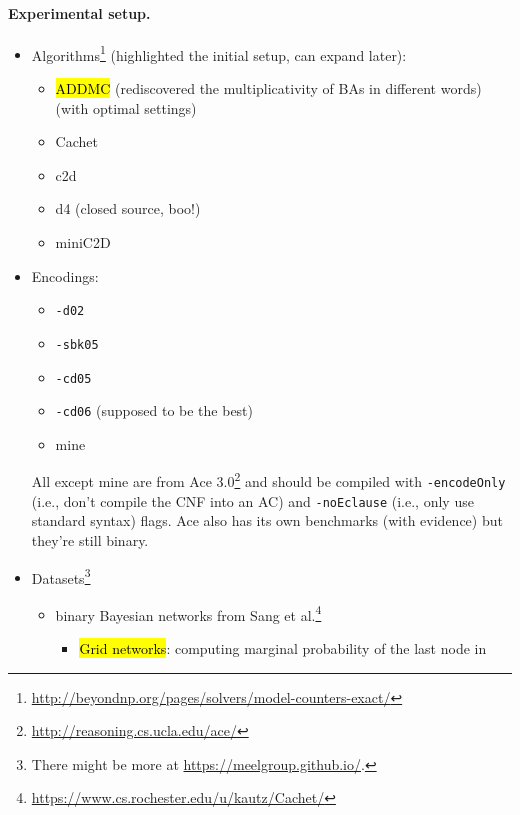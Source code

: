 \documentclass{article}
\theoremstyle{definition}
\theoremstyle{remark}
\begin{document}
\paragraph{Experimental setup.}
\begin{itemize}
\item
  Algorithms\footnote{\url{http://beyondnp.org/pages/solvers/model-counters-exact/}}
  (highlighted the initial setup, can expand later):
  \begin{itemize}
  \item \hl{ADDMC} \cite{DBLP:conf/aaai/DudekPV20} (rediscovered the
    multiplicativity of BAs in different words) (with optimal settings)
  \item Cachet \cite{DBLP:conf/sat/SangBBKP04}
  \item c2d \cite{DBLP:conf/ecai/Darwiche04}
  \item d4 \cite{DBLP:conf/ijcai/LagniezM17} (closed source, boo!)
  \item miniC2D  \cite{DBLP:conf/ijcai/OztokD15}
  \end{itemize}
\item Encodings:
  \begin{itemize}
  \item \texttt{-d02} \cite{DBLP:conf/kr/Darwiche02}
  \item \texttt{-sbk05} \cite{DBLP:conf/aaai/SangBK05}
  \item \texttt{-cd05} \cite{DBLP:conf/ijcai/ChaviraD05}
  \item \texttt{-cd06} \cite{DBLP:conf/sat/ChaviraD06} (supposed to be the best)
  \item mine
  \end{itemize}
  All except mine are from Ace
  3.0\footnote{\url{http://reasoning.cs.ucla.edu/ace/}} and should be compiled
  with \texttt{-encodeOnly} (i.e., don't compile the CNF into an AC) and
  \texttt{-noEclause} (i.e., only use standard syntax) flags. Ace also has its
  own benchmarks (with evidence) but they're still binary.
\item Datasets\footnote{There might be more at
    \url{https://meelgroup.github.io/}.}
  \begin{itemize}
  \item binary Bayesian networks from Sang et
    al.\footnote{\url{https://www.cs.rochester.edu/u/kautz/Cachet/}}
    \cite{DBLP:conf/aaai/SangBK05}
    \begin{itemize}
    \item \hl{Grid networks}: computing marginal probability of the last node in

\end{itemize}
\end{itemize}
\end{itemize}
\end{document}
